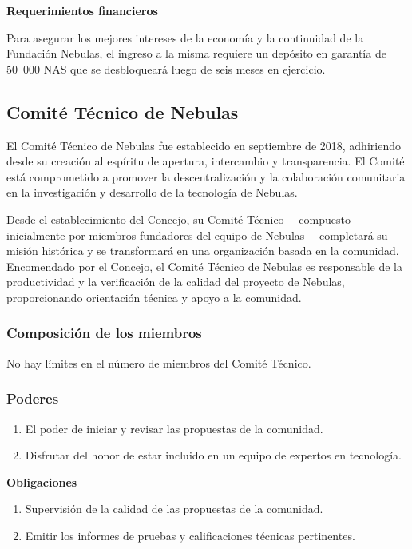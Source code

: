 \vspace{2em}

\textbf{Requerimientos financieros}

Para asegurar los mejores intereses de la economía y la continuidad de la Fundación Nebulas, el ingreso a la misma requiere un depósito en garantía de 50 000 NAS que se desbloqueará luego de seis meses en ejercicio.

\subsection{Comité Técnico de Nebulas}

El Comité Técnico de Nebulas fue establecido en septiembre de 2018, adhiriendo desde su creación al espíritu de apertura, intercambio y transparencia. El Comité está comprometido a promover la descentralización y la colaboración comunitaria en la investigación y desarrollo de la tecnología de Nebulas.

Desde el establecimiento del Concejo, su Comité Técnico —compuesto inicialmente por miembros fundadores del equipo de Nebulas— completará su misión histórica y se transformará en una organización basada en la comunidad. Encomendado por el Concejo, el Comité Técnico de Nebulas es responsable de la productividad y la verificación de la calidad del proyecto de Nebulas, proporcionando orientación técnica y apoyo a la comunidad.

\subsubsection{Composición de los miembros}

No hay límites en el número de miembros del Comité Técnico.

\subsubsection{Poderes}

\begin{enumerate}
	\item El poder de iniciar y revisar las propuestas de la comunidad.
	\item Disfrutar del honor de estar incluido en un equipo de expertos en tecnología.
\end{enumerate}

\textbf{Obligaciones}

\begin{enumerate}
	\item Supervisión de la calidad de las propuestas de la comunidad.
	\item Emitir los informes de pruebas y calificaciones técnicas pertinentes.
\end{enumerate}

